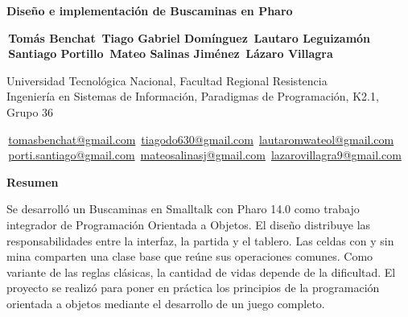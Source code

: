 \documentclass[a4paper,10pt]{article}
\newcommand{\autor}[2]{\raisebox{.48ex}{\fontsize{8bp}{9bp}\selectfont #1}\,#2}
\newcommand{\correo}[2]{\autor{#1}{\href{mailto:#2}{#2}}}
\begin{document}
\fontsize{10bp}{12bp}\selectfont

\begin{center}
  {\fontsize{16bp}{19bp}\selectfont\bfseries Diseño e implementación de Buscaminas en Pharo\par}
  \vspace{5bp}
  {\fontsize{11bp}{14bp}\selectfont\bfseries
  \autor{a}{Tomás Benchat}\quad
  \autor{b}{Tiago Gabriel Domínguez}\quad
  \autor{c}{Lautaro Leguizamón}\\
  \autor{d}{Santiago Portillo}\quad
  \autor{e}{Mateo Salinas Jiménez}\quad
  \autor{f}{Lázaro Villagra}\par}
  \vspace{3bp}
  Universidad Tecnológica Nacional, Facultad Regional Resistencia\\
  Ingeniería en Sistemas de Información, Paradigmas de Programación, K2.1, Grupo 36\\
  {\fontsize{9bp}{12bp}\selectfont
  \correo{a}{tomasbenchat@gmail.com}\quad
  \correo{b}{tiagodo630@gmail.com}\quad
  \correo{c}{lautaromwateol@gmail.com}\\
  \correo{d}{porti.santiago@gmail.com}\quad
  \correo{e}{mateosalinasj@gmail.com}\quad
  \correo{f}{lazarovillagra9@gmail.com}\par}
\end{center}

\begin{center}
\begin{minipage}{0.82\textwidth}
\setlength{\parskip}{6bp}
\textbf{Resumen}\par
Se desarrolló un Buscaminas en Smalltalk con Pharo 14.0 como trabajo integrador de Programación Orientada a Objetos. El diseño distribuye las responsabilidades entre la interfaz, la partida y el tablero. Las celdas con y sin mina comparten una clase base que reúne sus operaciones comunes. Como variante de las reglas clásicas, la cantidad de vidas depende de la dificultad. El proyecto se realizó para poner en práctica los principios de la programación orientada a objetos mediante el desarrollo de un juego completo.
\end{minipage}
\end{center}
\end{document}
